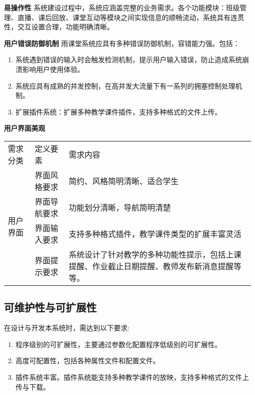 \textbf{易操作性}
系统建设过程中，系统应涵盖完整的业务需求。各个功能模块：班级管理、直播、课后回放、课堂互动等模块之间实现信息的顺畅流动，系统具有连贯性，交互设置合理，功能明确清晰。

\textbf{用户错误防御机制}
雨课堂系统应具有多种错误防御机制，容错能力强。包括：
\begin{enumerate}
\item 系统遇到错误的输入时会触发检测机制，提示用户输入错误，防止造成系统崩溃影响用户使用体验。
\item 系统应具有成熟的并发控制，在高并发大流量下有一系列的拥塞控制处理机制。
\item 扩展插件系统：扩展多种教学课件插件，支持多种格式的文件上传。
\end{enumerate}


\textbf{用户界面美观}
\begin{table}[]
\begin{tabular}{lll}
需求分类                  & 定义要素   & 需求内容                                           \\
\multirow{4}{*}{用户界面} & 界面风格要求 & 简约、风格简明清晰、适合学生                                 \\
                      & 界面导航要求 & 功能划分清晰，导航简明清楚                                  \\
                      & 界面输入要求 & 支持多种格式插件，教学课件类型的扩展丰富灵活                         \\
                      & 界面提示要求 & 系统设计了针对教学的多种功能性提示，包括上课提醒、作业截止日期提醒、教师发布新消息提醒等等。
\end{tabular}
\end{table}

\subsection{可维护性与可扩展性}
在设计与开发本系统时，需达到以下要求:

\begin{enumerate}
\item 程序级别的可扩展性，主要通过参数化配置程序低级别的可扩展性。
\item 高度可配置性，包括各种属性文件和配置文件。
\item 插件系统丰富。插件系统能支持多种教学课件的放映，支持多种格式的文件上传与下载。
\end{enumerate}
	
